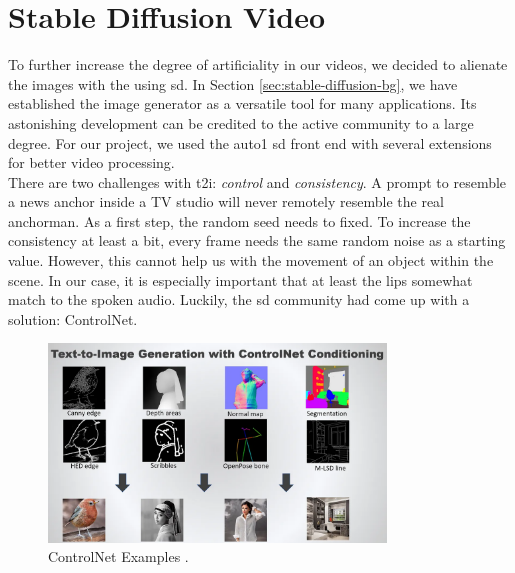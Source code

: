 \documentclass[
  a4paper,  %
  twoside,  %
  bibliography=totoc,
  headsepline,
  cleardoublepage=empty,
  parskip=half,
  draft=false
]{scrbook}
\begin{document}
\section{Stable Diffusion Video}
\label{sec:sd-video}
To further increase the degree of artificiality in our videos, we decided to alienate the images with the using \gls{sd}. In Section \ref{sec:stable-diffusion-bg}, we have established the image generator as a versatile tool for many applications. Its astonishing development can be credited to the active community to a large degree. For our project, we used the \gls{auto1} \gls{sd} front end with several extensions for better video processing. \\
There are two challenges with \gls{t2i}: \textit{control} and \textit{consistency}. A prompt to resemble a news anchor inside a TV studio will never remotely resemble the real anchorman. As a first step, the random seed needs to fixed. To increase the consistency at least a bit, every frame needs the same random noise as a starting value. However, this cannot help us with the movement of an object within the scene. In our case, it is especially important that at least the lips somewhat match to the spoken audio. Luckily, the \gls{sd} community had come up with a solution: ControlNet.

\begin{figure}[h]
  \centering
  \includegraphics[width=0.8\textwidth]{./graphics/diffusion/ControlNet.png}
  \caption{ControlNet Examples \cite{foongIntroductionControlNetStable2023}.}
  \label{fig:ControlNet}
\end{figure}
\end{document}
